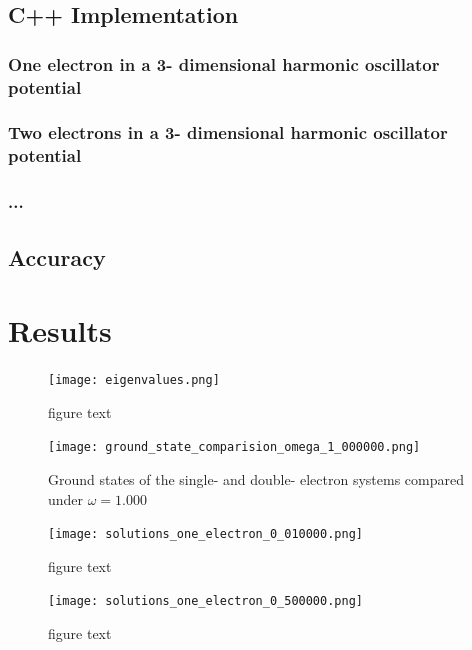 \documentclass[10pt,a4paper]{article}
\begin{document}
\subsection{C++ Implementation}
\subsubsection{One electron in a 3- dimensional harmonic oscillator potential}

\subsubsection{Two electrons in a 3- dimensional harmonic oscillator potential}

\subsubsection{...}

\subsection{Accuracy}

\section{Results}


\begin{figure}[H]
	\texttt{[image: eigenvalues.png]}
	\caption[Lowest eigenvalues of the single- and double- electron systems as a function of $\omega$]{figure text}
\end{figure}

\begin{figure}[H]
	\texttt{[image: ground\_state\_comparision\_omega\_1\_000000.png]}
	\caption[Ground states of the single- and double- electron systems]{Ground states of the single- and double- electron systems compared under $\omega =1.000$}
\end{figure}

\begin{figure}[H]
	\texttt{[image: solutions\_one\_electron\_0\_010000.png]}
	\caption[contents title]{figure text}
\end{figure}

\begin{figure}[H]
	\texttt{[image: solutions\_one\_electron\_0\_500000.png]}
	\caption[contents title]{figure text}
\end{figure}
\end{document}
